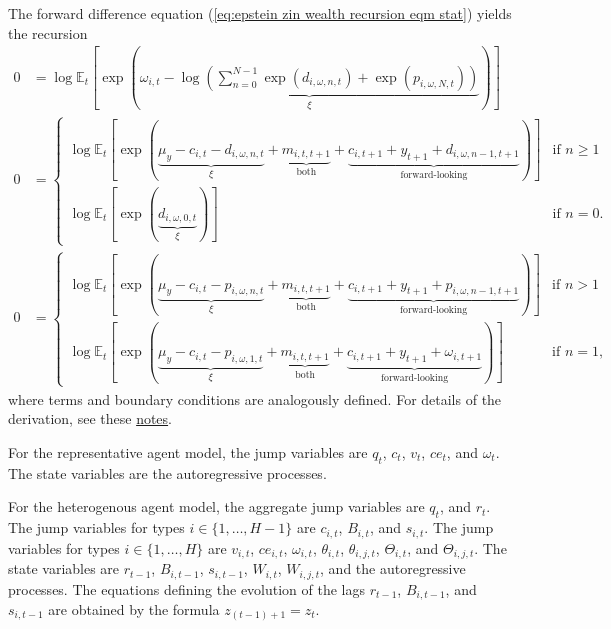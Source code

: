 \documentclass[12 pt, oneside]{article}
\theoremstyle{definition}
\theoremstyle{definition}
\theoremstyle{definition}
\newcommand{\E}{\mathbb{E}}
\begin{document}
The forward difference equation (\ref{eq:epstein zin wealth recursion eqm stat}) yields the recursion
\begin{align}
  0 & = \log\E_t\left[\exp\left(\underbrace{\omega_{i, t} - \log\left(\sum_{n = 0}^{N - 1}\exp(d_{i, \omega, n, t}) + \exp(p_{i, \omega, N, t})\right)}_{\xi}\right)\right]\\
  0 & =
      \begin{cases}
        \log\E_t\left[\exp\left(\underbrace{\mu_y - c_{i, t} - d_{i, \omega, n, t}}_{\xi} + \underbrace{m_{i, t, t + 1}}_{\text{both}} + \underbrace{c_{i, t + 1} + y_{t + 1} + d_{i, \omega, n - 1, t + 1}}_{\text{forward-looking}}\right)\right] & \text{if } n \geq 1\\
        \log\E_t\left[\exp\left(\underbrace{d_{i, \omega, 0, t}}_{\xi}\right)\right] & \text{if } n = 0.
      \end{cases}\\
  0 & =
      \begin{cases}
        \log\E_t\left[\exp\left(\underbrace{\mu_y - c_{i, t} - p_{i, \omega, n, t}}_{\xi} + \underbrace{m_{i, t, t + 1}}_{\text{both}} + \underbrace{c_{i, t + 1} + y_{t + 1} + p_{i, \omega, n - 1, t + 1}}_{\text{forward-looking}} \right)\right] & \text{if } n > 1\\
        \log\E_t\left[\exp\left(\underbrace{\mu_y - c_{i, t} - p_{i, \omega, 1, t}}_{\xi} + \underbrace{m_{i, t, t + 1}}_{\text{both}} + \underbrace{c_{i, t + 1} + y_{t + 1} + \omega_{i, t + 1}}_{\text{forward-looking}}\right)\right] & \text{if } n = 1,
      \end{cases}
\end{align}
where terms and boundary conditions are analogously defined. For details of the derivation, see these \href{https://github.com/chenwilliam77/RiskAdjustedLinearizations.jl/blob/main/examples/nk\_ezdis/nk\_ezdis.pdf}{notes}.

For the representative agent model, the jump variables are $q_t$, $c_t$, $v_t$, $ce_t$, and $\omega_t$.
The state variables are the autoregressive processes.


For the heterogenous agent model, the aggregate jump variables are $q_t$, and $r_t$. The jump variables for types $i\in \{1, \dots, H - 1\}$ are
$c_{i, t}$, $B_{i, t}$, and $s_{i, t}$. The jump variables for types $i\in \{1, \dots, H\}$ are $v_{i, t}$, $ce_{i, t}$, $\omega_{i, t}$, $\theta_{i, t}$, $\theta_{i, j, t}$, $\Theta_{i, t}$, and $\Theta_{i, j, t}$.
The state variables are $r_{t - 1}$, $B_{i, t - 1}$, $s_{i, t - 1}$, $W_{i, t}$, $W_{i, j, t}$, and the autoregressive processes.
The equations defining the evolution of the lags $r_{t - 1}$, $B_{i, t - 1}$, and $s_{i, t - 1}$ are obtained by the formula $z_{(t - 1) + 1} = z_t$.
\end{document}
